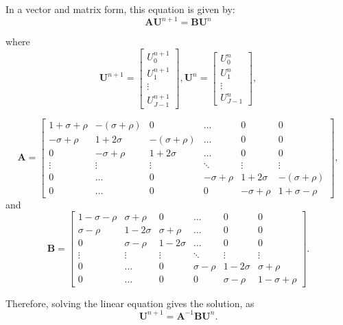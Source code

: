 \documentclass[12pt]{article}		%
\begin{document}
In a vector and matrix form, this equation is given by:
\[
	\textbf{A} \textbf{U}^{n+1} = \textbf{B} \textbf{U}^n
\]

where
\begin{equation*} %
	\textbf{U}^{n+1} = \begin{bmatrix} U_0^{n+1}\\ U_1^{n+1} \\ \vdots \\ U_{J-1}^{n+1} \end{bmatrix}, 
	\textbf{U}^n = \begin{bmatrix} U_0^n\\ U_1^n \\ \vdots \\ U_{J-1}^n \end{bmatrix},
\end{equation*}

\begin{equation*} %
	\textbf{A} = 
	\begin{bmatrix} 
	1 + \sigma + \rho & - (\sigma + \rho) & 0 & \hdots & 0 & 0 \\ 
	- \sigma + \rho & 1 + 2 \sigma & - (\sigma + \rho) & \hdots & 0 & 0\\
	0 & - \sigma + \rho & 1 + 2 \sigma & \hdots & 0 & 0 \\
	\vdots & \vdots & \vdots & \ddots & \vdots & \vdots\\
	0 & \hdots & 0 & - \sigma + \rho & 1+2\sigma & - (\sigma + \rho) \\
	0 & \hdots & 0 & 0 & - \sigma + \rho & 1 + \sigma - \rho
	\end{bmatrix},
\end{equation*}
and 
\begin{equation*}
	\textbf{B} = 
	\begin{bmatrix}
	1 - \sigma - \rho & \sigma + \rho & 0 & \hdots & 0 & 0 \\ 
	\sigma -\rho & 1 - 2 \sigma & \sigma +\rho & \hdots & 0 & 0\\
	0 & \sigma -\rho & 1 - 2 \sigma & \hdots & 0 & 0 \\
	\vdots & \vdots & \vdots & \ddots & \vdots & \vdots\\
	0 & \hdots & 0 & \sigma -\rho & 1- 2\sigma & \sigma +\rho \\
	0 & \hdots & 0 & 0 & \sigma -\rho & 1 - \sigma + \rho
	\end{bmatrix}.
\end{equation*} 

Therefore, solving the linear equation gives the solution, as
\[
		\textbf{U}^{n+1} = \textbf{A}^{-1} \textbf{B} \textbf{U}^n.
\]
\end{document}
